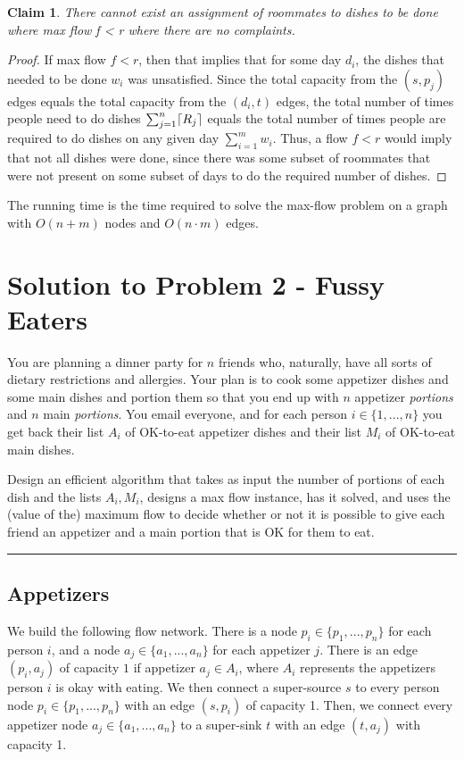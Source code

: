 \documentclass[11pt]{article}
\newtheorem{claim}[theorem]{Claim}
\DeclarePairedDelimiter\ceil{\lceil}{\rceil}
\begin{document}
\begin{claim}
There cannot exist an assignment of roommates to dishes to be done where max flow f < r where there are no complaints.
\end{claim}
\begin{proof}
If max flow $f < r$, then that implies that for some day $d_i$, the dishes that needed to be done $w_i$ was unsatisfied. Since the total capacity from the $(s, p_j)$ edges equals the total capacity from the $(d_i, t)$ edges, the total number of times people need to do dishes $\sum_{j=1}^{n}\ceil{R_j}$ equals the total number of times people are required to do dishes on any given day $\sum_{i=1}^{m}w_i$. Thus, a flow $f < r$ would imply that not all dishes were done, since there was some subset of roommates that were not present on some subset of days to do the required number of dishes.
\end{proof}

The running time is the time required to solve the max-flow problem on a graph with $O(n+m)$ nodes and $O(n \cdot m)$ edges.

\pagebreak



\section*{Solution to Problem 2 - Fussy Eaters}

You are planning a dinner party for $n$ friends who, naturally, have all sorts of dietary restrictions and allergies. Your plan is to cook some appetizer dishes and some main dishes and portion them so that you end up with $n$ appetizer \textit{portions} and $n$ main \textit{portions}. You email everyone, and for each person $i \in \{1, ... , n\}$ you get back their list $A_i$ of OK-to-eat appetizer dishes and their list $M_i$ of OK-to-eat main dishes.

Design an efficient algorithm that takes as input the number of portions of each dish and the lists $A_i, M_i$, designs a max flow instance, has it solved, and uses the (value of the) maximum flow to decide whether or not it is possible to give each friend an appetizer and a main portion that is OK for them to eat.

\noindent\rule{17cm}{0.4pt}
\subsection*{Appetizers}
We build the following flow network. There is a node $p_i \in \{p_1, ..., p_n\}$ for each person $i$, and a node $a_j \in \{a_1, ..., a_n\}$ for each appetizer $j$. There is an edge $(p_i, a_j)$ of capacity $1$ if appetizer $a_j \in A_i$, where $A_i$ represents the appetizers person $i$ is okay with eating. We then connect a super-source $s$ to every person node $p_i \in \{p_1, ..., p_n\}$ with an edge $(s, p_i)$ of capacity 1. Then, we connect every appetizer node $a_j \in \{a_1, ..., a_n\}$ to a super-sink $t$ with an edge $(t, a_j)$ with capacity 1.
\end{document}
